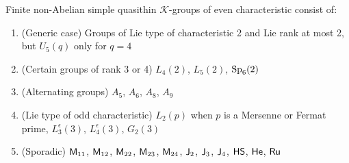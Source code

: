 \begin{proposition}
Finite non-Abelian simple quasithin $\mathcal{K}$-groups of even
characteristic consist of:
\begin{enumerate}
\item (Generic case) Groups of Lie type of characteristic 2 and Lie rank at most 2, but
  $U_{5}(q)$ only for $q=4$
\item (Certain groups of rank 3 or 4) $L_{4}(2)$, $L_{5}(2)$, $\mathrm{Sp}_{6}(2)$
\item (Alternating groups) $A_{5}$, $A_{6}$, $A_{8}$, $A_{9}$
\item (Lie type of odd characteristic) $L_{2}(p)$ when $p$ is a Mersenne
  or Fermat prime, $L_{3}^{\epsilon}(3)$, $L_{4}^{\epsilon}(3)$, $G_{2}(3)$
\item (Sporadic) $\mathsf{M}_{11}$, $\mathsf{M}_{12}$, $\mathsf{M}_{22}$,
$\mathsf{M}_{23}$, $\mathsf{M}_{24}$, $\mathsf{J}_{2}$, $\mathsf{J}_{3}$, $\mathsf{J}_{4}$,
$\mathsf{HS}$, $\mathsf{He}$, $\mathsf{Ru}$
\end{enumerate}
\end{proposition}
